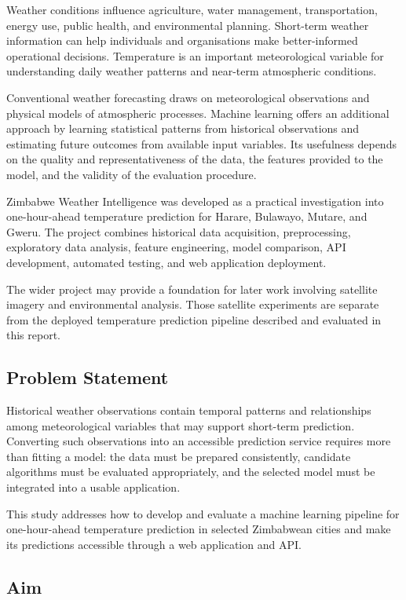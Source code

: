 \documentclass[12pt,a4paper]{article}
\begin{document}
	Weather conditions influence agriculture, water management,
	transportation, energy use, public health, and environmental
	planning. Short-term weather information can help individuals and
	organisations make better-informed operational decisions. Temperature
	is an important meteorological variable for understanding daily
	weather patterns and near-term atmospheric conditions.
	
	Conventional weather forecasting draws on meteorological observations
	and physical models of atmospheric processes. Machine learning offers
	an additional approach by learning statistical patterns from
	historical observations and estimating future outcomes from
	available input variables. Its usefulness depends on the quality
	and representativeness of the data, the features provided to the
	model, and the validity of the evaluation procedure.
	
	Zimbabwe Weather Intelligence was developed as a practical
	investigation into one-hour-ahead temperature prediction for Harare,
	Bulawayo, Mutare, and Gweru. The project combines historical data
	acquisition, preprocessing, exploratory data analysis, feature
	engineering, model comparison, API development, automated testing,
	and web application deployment.
	
	The wider project may provide a foundation for later work involving
	satellite imagery and environmental analysis. Those satellite
	experiments are separate from the deployed temperature prediction
	pipeline described and evaluated in this report.
	
	\subsection{Problem Statement}
	
	Historical weather observations contain temporal patterns and
	relationships among meteorological variables that may support
	short-term prediction. Converting such observations into an
	accessible prediction service requires more than fitting a model:
	the data must be prepared consistently, candidate algorithms must
	be evaluated appropriately, and the selected model must be integrated
	into a usable application.
	
	This study addresses how to develop and evaluate a machine learning
	pipeline for one-hour-ahead temperature prediction in selected
	Zimbabwean cities and make its predictions accessible through a
	web application and API.
	
	\subsection{Aim}
	
\end{document}
